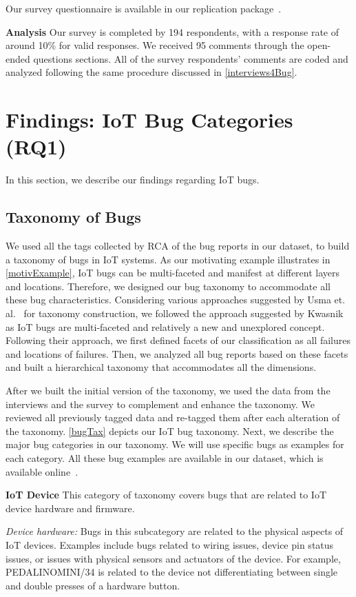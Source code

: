Our survey questionnaire is available in our replication package~\cite{surveyQs}.

\textbf{Analysis}
Our survey is completed by 194 respondents, with a response rate of around 10\% for valid responses. 
We received 95 comments through the open-ended questions sections. All of the survey respondents' comments are coded and analyzed following the same procedure discussed in \autoref{interviews4Bug}.

\section{Findings: IoT Bug Categories (RQ1)}
In this section, we describe our findings regarding IoT bugs. 


\subsection{Taxonomy of Bugs}
We used all the tags collected by RCA of the bug reports in our dataset, to build a taxonomy of bugs in IoT systems. As our motivating example illustrates in \autoref{motivExample}, IoT bugs can be multi-faceted and manifest at different layers and locations. Therefore, we designed our bug taxonomy to accommodate all these bug characteristics. Considering various approaches suggested by Usma et. al.~\cite{usman2017taxonomies} for taxonomy construction, we followed the approach suggested by Kwasnik~\cite{kwasnik1999role} as IoT bugs are multi-faceted and relatively a new and unexplored concept. Following their approach, we first defined facets of our classification as all failures and locations of failures. Then, we analyzed all bug reports based on these facets and built a hierarchical taxonomy that accommodates all the dimensions.

After we built the initial version of the taxonomy, we used the data from the interviews and the survey to complement and enhance the taxonomy. We reviewed all previously tagged data and re-tagged them after each alteration of the taxonomy. \autoref{bugTax} depicts our IoT bug taxonomy. Next, we describe the major bug categories in our taxonomy. We will use specific bugs as examples for each category. All these bug examples are available in our dataset, which is available online~\cite{repPack}. 


\textbf{IoT Device}
This category of taxonomy covers bugs that are related to IoT device hardware and firmware.

\textit{Device hardware:}
Bugs in this subcategory are related to the physical aspects of IoT devices.  Examples include bugs related to wiring issues, device pin status issues, or issues with physical sensors and actuators of the device. For example, PEDALINOMINI/34 is related to the device not differentiating between single and double presses of a hardware button. 
 
